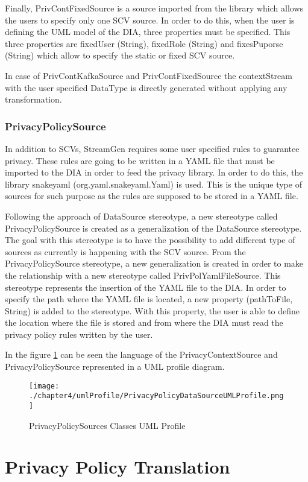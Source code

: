 Finally, PrivContFixedSource is a source imported from the library which allows the users to specify only one SCV source. In order to do this, when the user is defining the UML model of the DIA, three properties must be specified. This three properties are fixedUser (String), fixedRole (String) and fixesPuporse (String) which allow to specify the static or fixed SCV source.

In case of PrivContKafkaSource and PrivContFixedSource the contextStream with the user specified DataType is directly generated without applying any transformation.

\subsubsection{PrivacyPolicySource}

In addition to SCVs, StreamGen requires some user specified rules to guarantee privacy. These rules are going to be written in a YAML file that must be imported to the DIA in order to feed the privacy library. In order to do this, the library snakeyaml (org.yaml.snakeyaml.Yaml) is used. This is the unique type of sources for such purpose as the rules are supposed to be stored in a YAML file.

Following the approach of DataSource stereotype, a new stereotype called PrivacyPolicySource is created as a generalization of the DataSource stereotype. The goal with this stereotype is to have the possibility to add different type of sources as currently is happening with the SCV source. From the PrivacyPolicySource stereotype, a new generalization is created in order to make the relationship with a new stereotype called PrivPolYamlFileSource. This stereotype represents the insertion of the YAML file to the DIA. In order to specify the path where the YAML file is located, a new property (pathToFile, String) is added to the stereotype. With this property, the user is able to define the location where the file is stored and from where the DIA must read the privacy policy rules written by the user.

In the figure \ref{fig:PrivacyPolicySources Classes UML Profile} can be seen the language of the PrivacyContextSource and PrivacyPolicySource represented in a UML profile diagram.

\begin{figure}
\centering
{\texttt{[image: ./chapter4/umlProfile/PrivacyPolicyDataSourceUMLProfile.png]}}
\caption{PrivacyPolicySources Classes UML Profile}
\label{fig:PrivacyPolicySources Classes UML Profile}
\end{figure}

\section{Privacy Policy Translation}

















